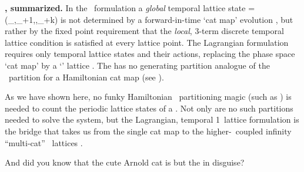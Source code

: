\bigskip

\noindent\textbf{\tempLatt, summarized.}
In the \spt\ formulation a \emph{global} {temporal lattice state}
\beq
\transp{\Xx} %
             = (\ssp_\zeit,\ssp_{\zeit+1},\cdots,\ssp_{\zeit+k})
is not determined by a forward-in-time `cat map' evolution
, but rather by the fixed point requirement
 that the \emph{local}, 3-term discrete temporal
lattice condition  is satisfied at every lattice
point. The Lagrangian formulation requires only temporal lattice states
and their actions, replacing the phase space `cat map' 
by a `{\templatt}' lattice . The {\templatt} has no
generating partition analogue of the \AW\ partition for a Hamiltonian cat
map (see ).

As we have shown here, no funky Hamiltonian \statesp\ partitioning magic
(such as ) is needed to count the periodic
lattice states of a \templatt. Not only are no such partitions needed to
solve the system, but the Lagrangian, temporal 1\dmn\ lattice formulation
is the bridge that takes us from the single cat map  to
the higher-\dmn\ coupled infinity ``multi-cat'' \spt\ lattices
.

And did you know that the cute Arnold cat is but the %
{\sPe} in disguise?


\renewcommand{\period}[1]{{\ensuremath{T_{#1}}}}         %
